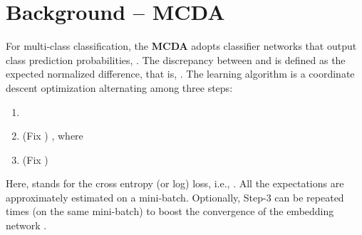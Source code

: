 \documentclass[10pt,letterpaper]{article}
\begin{document}
\section{Background -- MCDA~\cite{saito2018}}\label{sec:mcd}

For multi-class classification, the \textbf{MCDA} adopts classifier networks that output class prediction probabilities, .  The discrepancy between  and  is defined as the expected normalized  difference, that is, .
The learning algorithm is a coordinate descent optimization alternating among three steps:
\begin{enumerate}
\item 
\item (Fix ) , 
  where 
\item (Fix ) 
\end{enumerate}
Here,  stands for the cross entropy (or log) loss, i.e., . All the expectations are approximately estimated on a mini-batch. Optionally, Step-3 can be repeated  times (on the same mini-batch) to boost the convergence of the embedding network .





\newpage
\end{document}
